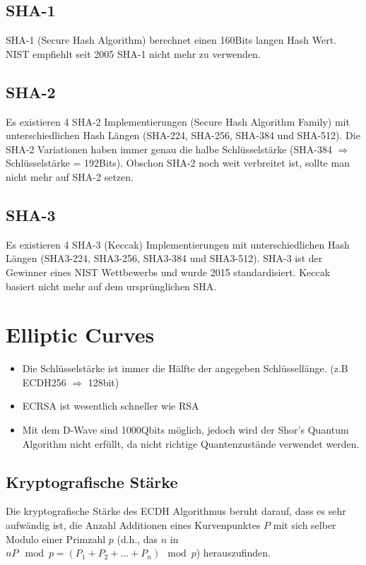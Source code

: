 \subsection{SHA-1 }
SHA-1 (Secure Hash Algorithm) berechnet einen 160Bits langen Hash Wert. NIST empfiehlt seit 2005 SHA-1 nicht mehr zu verwenden. 

\subsection{SHA-2}
Es existieren 4 SHA-2 Implementierungen (Secure Hash Algorithm Family) mit unterschiedlichen Hash Längen (SHA-224, SHA-256, SHA-384 und SHA-512). Die SHA-2 Variationen haben immer genau die halbe Schlüsselstärke (SHA-384 $\Rightarrow$ Schlüsselstärke = 192Bits). Obschon SHA-2 noch weit verbreitet ist, sollte man nicht mehr auf SHA-2 setzen.

\subsection{SHA-3}
Es existieren 4 SHA-3 (Keccak) Implementierungen mit unterschiedlichen Hash Längen (SHA3-224, SHA3-256, SHA3-384 und SHA3-512). SHA-3 ist der Gewinner eines NIST Wettbewerbs und wurde 2015 standardisiert. Keccak basiert nicht mehr auf dem ursprünglichen SHA.


\section{Elliptic Curves}
\begin{itemize}
	\item Die Schlüsselstärke ist immer die Hälfte der angegeben Schlüssellänge. (z.B ECDH256 $\Rightarrow$ 128bit)
	\item ECRSA ist wesentlich schneller wie RSA
	\item Mit dem D-Wave sind 1000Qbits möglich, jedoch wird der Shor's Quantum Algorithm nicht erfüllt, da nicht richtige Quantenzustände verwendet werden.
\end{itemize}

\subsection{Kryptografische Stärke}
Die kryptografische Stärke des ECDH Algorithmus beruht darauf, dass es sehr aufwändig ist, die Anzahl Additionen eines Kurvenpunktes $P$ mit sich selber Modulo einer Primzahl $p$ (d.h., das $n$ in $nP \mod p = (P_1 + P_2 + ... + P_n) \mod p$) herauszufinden.


